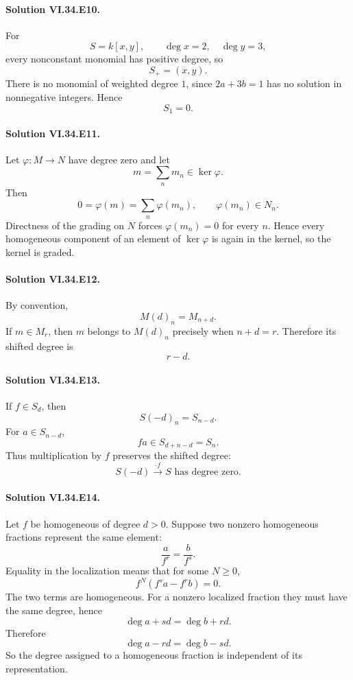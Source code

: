\paragraph{Solution VI.34.E10.}
For
\[
S=k[x,y],\qquad \deg x=2,\quad \deg y=3,
\]
every nonconstant monomial has positive degree, so
\[
\boxed{S_+=(x,y)}.
\]
There is no monomial of weighted degree \(1\), since \(2a+3b=1\) has no solution in nonnegative integers. Hence
\[
\boxed{S_1=0}.
\]

\paragraph{Solution VI.34.E11.}
Let \(\varphi:M\to N\) have degree zero and let
\[
m=\sum_nm_n\in\ker\varphi.
\]
Then
\[
0=\varphi(m)=\sum_n\varphi(m_n),
\qquad
\varphi(m_n)\in N_n.
\]
Directness of the grading on \(N\) forces \(\varphi(m_n)=0\) for every \(n\). Hence every homogeneous component of
an element of \(\ker\varphi\) is again in the kernel, so the kernel is graded.

\paragraph{Solution VI.34.E12.}
By convention,
\[
M(d)_n=M_{n+d}.
\]
If \(m\in M_r\), then \(m\) belongs to \(M(d)_n\) precisely when \(n+d=r\). Therefore its shifted degree is
\[
\boxed{r-d}.
\]

\paragraph{Solution VI.34.E13.}
If \(f\in S_d\), then
\[
S(-d)_n=S_{n-d}.
\]
For \(a\in S_{n-d}\),
\[
fa\in S_{d+n-d}=S_n.
\]
Thus multiplication by \(f\) preserves the shifted degree:
\[
\boxed{S(-d)\xrightarrow{\cdot f}S\text{ has degree zero}}.
\]

\paragraph{Solution VI.34.E14.}
Let \(f\) be homogeneous of degree \(d>0\). Suppose two nonzero homogeneous fractions represent the same element:
\[
\frac{a}{f^r}=\frac{b}{f^s}.
\]
Equality in the localization means that for some \(N\ge0\),
\[
f^N(f^sa-f^rb)=0.
\]
The two terms are homogeneous. For a nonzero localized fraction they must have the same degree, hence
\[
\deg a+sd=\deg b+rd.
\]
Therefore
\[
\deg a-rd=\deg b-sd.
\]
So the degree assigned to a homogeneous fraction is independent of its representation.

